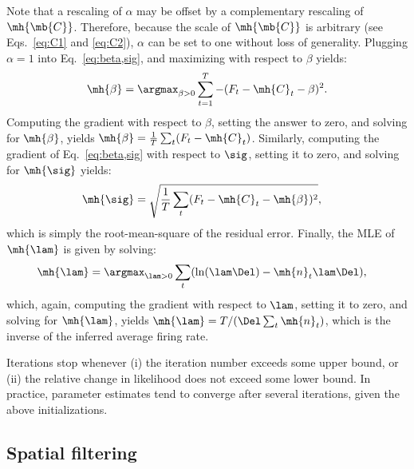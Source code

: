 Note that a rescaling of $\alpha$ may be offset by a complementary rescaling of $\mh{\mb{C}}$.  Therefore, because the scale of $\mh{\mb{C}}$ is arbitrary (see Eqs.~\eqref{eq:C1} and \eqref{eq:C2}), $\alpha$ can be set to one without loss of generality.  
Plugging $\alpha=1$ into Eq.~\eqref{eq:beta,sig}, and maximizing with respect to $\beta$ yields:
\begin{align}
\mh{\beta} = \argmax_{\beta>0} \sum_{t=1}^T -(F_t - \mh{C}_t - \beta)^2.
\end{align}
\noindent Computing the gradient with respect to $\beta$, setting the answer to zero, and solving for $\mh{\beta}$, yields $\mh{\beta} = \frac{1}{T} \sum_t (F_t-\mh{C}_t)$.  Similarly, computing the gradient of Eq.~\eqref{eq:beta,sig} with respect to $\sig$, setting it to zero, and solving for $\mh{\sig}$ yields:
\begin{align}
\mh{\sig} &= \sqrt{\frac{1}{T} \sum_t (F_t - \mh{C}_t - \mh{\beta})^2},
\end{align}
which is simply the root-mean-square of the residual error.  Finally, the MLE of $\mh{\lam}$ is given by solving:
\begin{align}
\mh{\lam} &= \argmax_{\lam>0} \sum_t (\ln (\lam \Del) - \mh{n}_t \lam \Del),
\end{align}
which, again, computing the gradient with respect to $\lam$, setting it to zero, and solving for $\mh{\lam}$, yields $\mh{\lam}=T/ (\Del \sum_t \mh{n}_t)$, which is the inverse of the inferred average firing rate.


Iterations stop whenever (i) the iteration number exceeds some upper bound, or (ii) the relative change in likelihood does not exceed some lower bound.  In practice, parameter estimates tend to converge after several iterations, given the above initializations. 


\subsection{Spatial filtering} \label{sec:methods:spatial}

